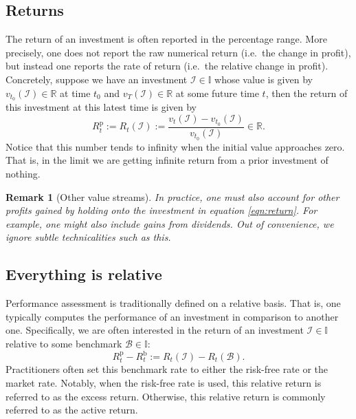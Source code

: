 \documentclass[12pt]{article}
\newtheorem{remark}{Remark}[section]
\begin{document}
\subsection{Returns}
The return of an investment is often reported in the percentage range. More precisely, one does not report the raw numerical return (i.e.\ the change in profit), but instead one reports the rate of return (i.e.\ the relative change in profit). Concretely, suppose we have an investment $\mathcal{I} \in \mathbb{I}$ whose value is given by $v_{t_0}(\mathcal{I}) \in \mathbb{R}$ at time $t_0$ and $v_T(\mathcal{I}) \in \mathbb{R}$ at some future time $t$, then the return of this investment at this latest time is given by
\begin{equation}
    R_t^{\text{p}} := R_t(\mathcal{I}) := \frac{v_t(\mathcal{I}) - v_{t_0}(\mathcal{I})}{v_{t_0}(\mathcal{I})} \in \mathbb{R}.
    \label{eqn:return}
\end{equation}
Notice that this number tends to infinity when the initial value approaches zero. That is, in the limit we are getting infinite return from a prior investment of nothing.

\begin{remark}
	[Other value streams] In practice, one must also account for other profits gained by holding onto the investment in equation \eqref{eqn:return}. For example, one might also include gains from dividends. Out of convenience, we ignore subtle technicalities such as this.
\end{remark}

\subsection{Everything is relative}
Performance assessment is traditionally defined on a relative basis. That is, one typically computes the performance of an investment in comparison to another one. Specifically, we are often interested in the return of an investment $\mathcal{I} \in \mathbb{I}$ relative to some benchmark $\mathcal{B} \in \mathbb{I}$:
\begin{equation}
    R_t^{\text{p}} - R_t^{\text{b}} := R_t(\mathcal{I}) - R_t(\mathcal{B}).
    \label{eqn:relative_return}
\end{equation}
Practitioners often set this benchmark rate to either the risk-free rate or the market rate. Notably, when the risk-free rate is used, this relative return is referred to as the excess return. Otherwise, this relative return is commonly referred to as the active return.
\end{document}
